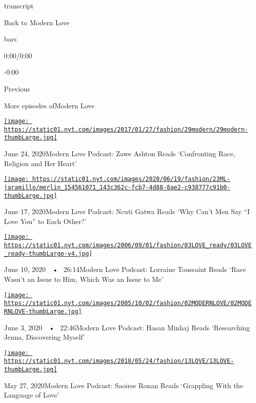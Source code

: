 transcript

Back to Modern Love

bars

0:00/0:00

-0:00

Previous

More episodes ofModern Love

\href{https://www.nytimes.com/2020/06/24/style/modern-love-podcast-zawe-ashton.html?action=click\&module=audio-series-bar\&region=header\&pgtype=Article}{\texttt{[image: https://static01.nyt.com/images/2017/01/27/fashion/29modern/29modern-thumbLarge.jpg]}}

June 24, 2020Modern Love Podcast: Zawe Ashton Reads `Confronting Race,
Religion and Her Heart'

\href{https://www.nytimes.com/2020/06/17/style/modern-love-podcast-ncuti-gatwa.html?action=click\&module=audio-series-bar\&region=header\&pgtype=Article}{\texttt{[image: https://static01.nyt.com/images/2020/06/19/fashion/23ML-jaramillo/merlin\_154561071\_143c362c-fcb7-4d88-8ae2-c938777c91b0-thumbLarge.jpg]}}

June 17, 2020Modern Love Podcast: Ncuti Gatwa Reads `Why Can't Men Say
``I Love You'' to Each Other?'

\href{https://www.nytimes.com/2020/06/10/style/modern-love-podcast-lorraine-toussant-updated-poscript.html?action=click\&module=audio-series-bar\&region=header\&pgtype=Article}{\texttt{[image: https://static01.nyt.com/images/2006/09/01/fashion/03LOVE\_ready/03LOVE\_ready-thumbLarge-v4.jpg]}}

June 10, 2020~~•~ 26:14Modern Love Podcast: Lorraine Toussaint Reads
`Race Wasn't an Issue to Him, Which Was an Issue to Me'

\href{https://www.nytimes.com/2020/06/03/style/modern-love-podcast-hasan-minhaj.html?action=click\&module=audio-series-bar\&region=header\&pgtype=Article}{\texttt{[image: https://static01.nyt.com/images/2005/10/02/fashion/02MODERNLOVE/02MODERNLOVE-thumbLarge.jpg]}}

June 3, 2020~~•~ 22:46Modern Love Podcast: Hasan Minhaj Reads
`Researching Jenna, Discovering Myself'

\href{https://www.nytimes.com/2020/05/27/style/modern-love-podcast-saoirse-ronan.html?action=click\&module=audio-series-bar\&region=header\&pgtype=Article}{\texttt{[image: https://static01.nyt.com/images/2018/05/24/fashion/13LOVE/13LOVE-thumbLarge.jpg]}}

May 27, 2020Modern Love Podcast: Saoirse Ronan Reads `Grappling With the
Language of Love'

